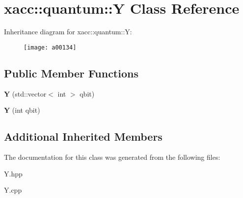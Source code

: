 \hypertarget{a00134}{}\section{xacc\+:\+:quantum\+:\+:Y Class Reference}
\label{a00134}
Inheritance diagram for xacc\+:\+:quantum\+:\+:Y\+:\begin{figure}[H]
\begin{center}
\leavevmode
\texttt{[image: a00134]}
\end{center}
\end{figure}
\subsection*{Public Member Functions}
\begin{DoxyCompactItemize}
\item 
{\bfseries Y} (std\+::vector$<$ int $>$ qbit)\hypertarget{a00134_a7959be0aa8221c0b1ba445771f5ecf0a}{}\label{a00134_a7959be0aa8221c0b1ba445771f5ecf0a}

\item 
{\bfseries Y} (int qbit)\hypertarget{a00134_aea2b37ac45208cbf6a47e0074e4a9653}{}\label{a00134_aea2b37ac45208cbf6a47e0074e4a9653}

\end{DoxyCompactItemize}
\subsection*{Additional Inherited Members}


The documentation for this class was generated from the following files\+:\begin{DoxyCompactItemize}
\item 
Y.\+hpp\item 
Y.\+cpp\end{DoxyCompactItemize}
